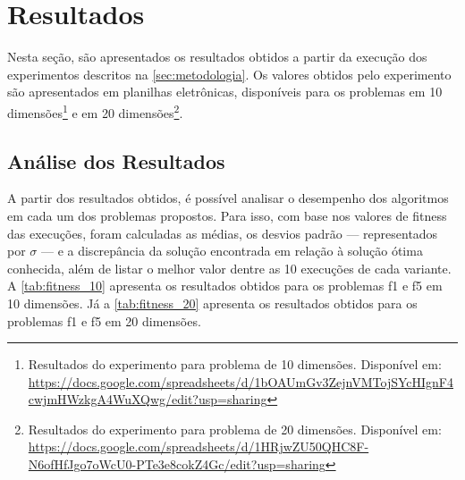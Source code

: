 \section{Resultados}%
\label{sec:resultados}

Nesta seção, são apresentados os resultados obtidos a partir da execução dos experimentos descritos na \autoref{sec:metodologia}.
Os valores obtidos pelo experimento são apresentados em planilhas eletrônicas, disponíveis para os problemas em 10 dimensões\footnote{Resultados do experimento para problema de 10 dimensões. Disponível em: \url{https://docs.google.com/spreadsheets/d/1bOAUmGv3ZejnVMTojSYcHIgnF4cwjmHWzkgA4WuXQwg/edit?usp=sharing}} e em 20 dimensões\footnote{Resultados do experimento para problema de 20 dimensões. Disponível em: \url{https://docs.google.com/spreadsheets/d/1HRjwZU50QHC8F-N6ofHfJgo7oWcU0-PTe3e8cokZ4Gc/edit?usp=sharing}}.

\subsection{Análise dos Resultados}%

A partir dos resultados obtidos, é possível analisar o desempenho dos algoritmos em cada um dos problemas propostos.
Para isso, com base nos valores de \gls{fitness} das execuções, foram calculadas as médias, os desvios padrão --- representados por \( \sigma \) --- e a discrepância da solução encontrada em relação à solução ótima conhecida, além de listar o melhor valor dentre as 10 execuções de cada variante.
A \autoref{tab:fitness_10} apresenta os resultados obtidos para os problemas \gls{f1} e \gls{f5} em 10 dimensões. Já a \autoref{tab:fitness_20} apresenta os resultados obtidos para os problemas \gls{f1} e \gls{f5} em 20 dimensões.


